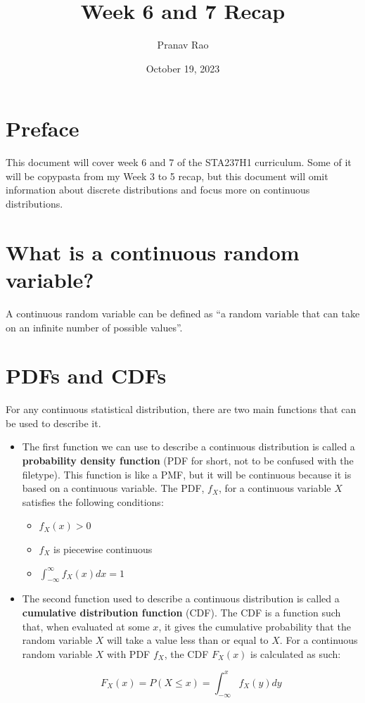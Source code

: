 \documentclass[12pt]{article}
\title{Week 6 and 7 Recap}
\author{Pranav Rao}
\date{October 19, 2023}
\begin{document}
\maketitle

\section*{Preface}

This document will cover week 6 and 7 of the STA237H1 curriculum. Some of it
will be copypasta from my Week 3 to 5 recap, but this document will omit
information about discrete distributions and focus more on continuous
distributions.

\section*{What is a continuous random variable?}

A continuous random variable can be defined as ``a random variable that can
take on an infinite number of possible values''.

\section*{PDFs and CDFs}

For any continuous statistical distribution, there are two main functions that can be used
to describe it.

\begin{itemize}
	\item The first function we can use to describe a continuous distribution
	      is called a \textbf{probability density function} (PDF for short, not
	      to be confused with the filetype). This function is like a PMF, but it
	      will be continuous because it is based on a continuous variable. The PDF,
	      $f_X$, for a continuous variable $X$ satisfies the following conditions:
	      \begin{itemize}
		      \item $f_X(x) > 0$
		      \item $f_X$ is piecewise continuous
		      \item $\int_{-\infty}^{\infty} f_X(x) dx = 1$
	      \end{itemize}
	\item The second function used to describe a continuous distribution is called a
	      \textbf{cumulative distribution function} (CDF). The CDF is a
	      function such that, when evaluated at some $x$, it gives the
	      cumulative probability that the random variable $X$ will take a value
	      less than or equal to $X$. For a continuous random variable $X$ with
	      PDF $f_X$, the CDF $F_X(x)$ is calculated as such:

	      \[ F_X(x) = P(X \leq x) =
		      \int_{-\infty}^{x}f_X(y)dy
	      \]
\end{itemize}
\end{document}
